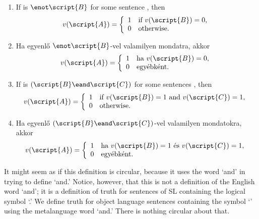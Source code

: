 \begin{enumerate}
\item If  is ${\enot}\script{B}$ for some sentence , then
\begin{displaymath}v(\script{A}) =
	\left\{\begin{array}{ll}
	1 & \mbox{if $v(\script{B}) = 0$},\\
	0 & \mbox{otherwise.}
	\end{array}\right.
\end{displaymath}
\item Ha  egyenlő ${\enot}\script{B}$-vel valamilyen  mondatra, akkor
\begin{displaymath}v(\script{A}) =
	\left\{\begin{array}{ll}
	1 & \mbox{ha $v(\script{B}) = 0$},\\
	0 & \mbox{egyébként.}
	\end{array}\right.
\end{displaymath}
\item If  is $(\script{B}\eand\script{C})$ for some sentences , then
\begin{displaymath}v(\script{A}) =
	\left\{\begin{array}{ll}
	1 & \mbox{if $v(\script{B}) = 1$ and $v(\script{C}) = 1$,}\\
	0 & \mbox{otherwise.}
	\end{array}\right.
\end{displaymath}
\item Ha  egyenlő $(\script{B}\eand\script{C})$-vel valamilyen   mondatokra, akkor
\begin{displaymath}v(\script{A}) =
	\left\{\begin{array}{ll}
	1 & \mbox{ha $v(\script{B}) = 1$ és $v(\script{C}) = 1$,}\\
	0 & \mbox{egyébként.}
	\end{array}\right.
\end{displaymath}
\end{enumerate}

It might seem as if this definition is circular, because it uses the word `and' in trying to define `and.' Notice, however, that this is not a definition of the English word `and'; it is a definition of truth for sentences of SL containing the logical symbol `\eand.' We define truth for object language sentences containing the symbol `\eand' using the metalanguage word `and.' There is nothing circular about that.

